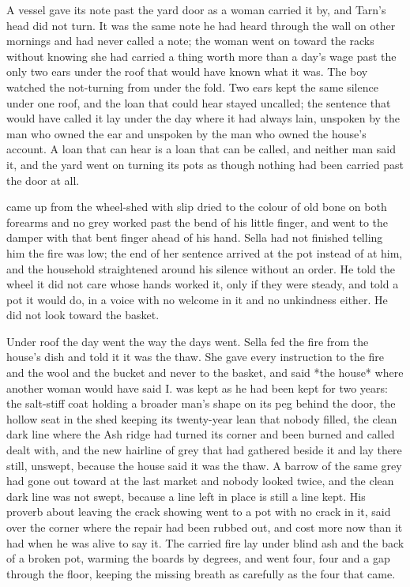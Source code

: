 A vessel gave its note past the yard door as a woman carried it by, and Tarn's head did not turn. It was the same note he had heard through the wall on other mornings and had never called a note; the woman went on toward the racks without knowing she had carried a thing worth more than a day's wage past the only two ears under the roof that would have known what it was. The boy watched the not-turning from under the fold. Two ears kept the same silence under one roof, and the loan that could hear stayed uncalled; the sentence that would have called it lay under the day where it had always lain, unspoken by the man who owned the ear and unspoken by the man who owned the house's account. A loan that can hear is a loan that can be called, and neither man said it, and the yard went on turning its pots as though nothing had been carried past the door at all.

 came up from the wheel-shed with slip dried to the colour of old bone on both forearms and no grey worked past the bend of his little finger, and went to the damper with that bent finger ahead of his hand. Sella had not finished telling him the fire was low; the end of her sentence arrived at the pot instead of at him, and the household straightened around his silence without an order. He told the wheel it did not care whose hands worked it, only if they were steady, and told a pot it would do, in a voice with no welcome in it and no unkindness either. He did not look toward the basket.

\scenebreak

Under  roof the day went the way the days went. Sella fed the fire from the house's dish and told it it was the thaw. She gave every instruction to the fire and the wool and the bucket and never to the basket, and said *the house* where another woman would have said I.  was kept as he had been kept for two years: the salt-stiff coat holding a broader man's shape on its peg behind the door, the hollow seat in the shed keeping its twenty-year lean that nobody filled, the clean dark line where the Ash ridge had turned its corner and been burned and called dealt with, and the new hairline of grey that had gathered beside it and lay there still, unswept, because the house said it was the thaw. A barrow of the same grey had gone out toward  at the last market and nobody looked twice, and the clean dark line was not swept, because a line left in place is still a line kept. His proverb about leaving the crack showing went to a pot with no crack in it, said over the corner where the repair had been rubbed out, and cost more now than it had when he was alive to say it. The carried fire lay under blind ash and the back of a broken pot, warming the boards by degrees, and  went four, four and a gap through the floor, keeping the missing breath as carefully as the four that came.

